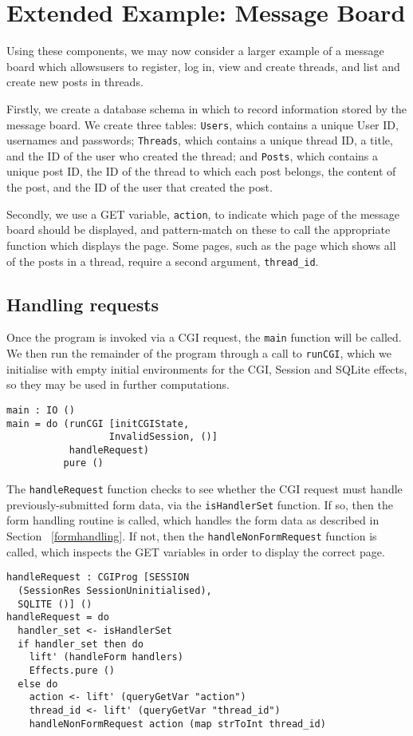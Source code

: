\documentclass[preprint]{sigplanconf}
\begin{document}

\section{Extended Example: Message Board}
\label{messageboard}
Using these components, we may now consider a larger example of a message board which allowsusers to register, log in, view and create threads, and list and create new posts in threads. 

Firstly, we create a database schema in which to record information stored by the message board. We create three tables: \texttt{Users}, which contains a unique User ID, usernames and passwords; \texttt{Threads}, which contains a unique thread ID, a title, and the ID of the user who created the thread; and \texttt{Posts}, which contains a unique post ID, the ID of the thread to which each post belongs, the content of the post, and the ID of the user that created the post.

Secondly, we use a GET variable, \texttt{action}, to indicate which page of the message board should be displayed, and pattern-match on these to call the appropriate function which displays the page. Some pages, such as the page which shows all of the posts in a thread, require a second argument, \texttt{thread\_id}. 
\subsection{Handling requests}
Once the program is invoked via a CGI request, the \texttt{main} function will be called. We then run the remainder of the program through a call to \texttt{runCGI}, which we initialise with empty initial environments for the CGI, Session and SQLite effects, so they may be used in further computations. 

{\small
\begin{verbatim}
main : IO ()
main = do (runCGI [initCGIState, 
                  InvalidSession, ()] 
           handleRequest)
          pure ()
\end{verbatim}
}
The \texttt{handleRequest} function checks to see whether the CGI request must handle previously-submitted form data, via the \texttt{isHandlerSet} function. If so, then the form handling routine is called, which handles the form data as described in Section ~\ref{formhandling}. If not, then the \texttt{handleNonFormRequest} function is called, which inspects the GET variables in order to display the correct page.
{\small
\begin{verbatim}
handleRequest : CGIProg [SESSION 
  (SessionRes SessionUninitialised), 
  SQLITE ()] ()
handleRequest = do 
  handler_set <- isHandlerSet
  if handler_set then do
    lift' (handleForm handlers)
    Effects.pure ()
  else do
    action <- lift' (queryGetVar "action")
    thread_id <- lift' (queryGetVar "thread_id")
    handleNonFormRequest action (map strToInt thread_id)
\end{verbatim}
}
\end{document}
